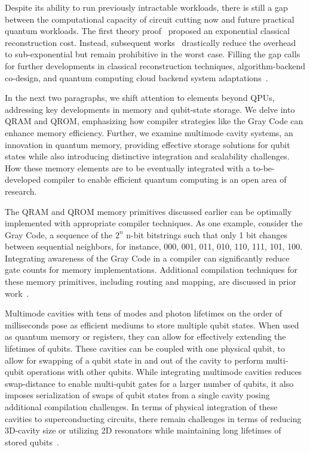 Despite its ability to run previously intractable workloads, there is still a gap between the computational capacity of circuit cutting now and future practical quantum workloads. The first theory proof~\cite{peng2020simulating} proposed an exponential classical reconstruction cost. Instead, subsequent works~\cite{tang2022scaleqc} drastically reduce the overhead to sub-exponential but remain prohibitive in the worst case. Filling the gap calls for further developments in classical reconstruction techniques, algorithm-backend co-design, and quantum computing cloud backend system adaptations~\cite{serverless}.

In the next two paragraphs, we shift attention to elements beyond QPUs, addressing key developments in memory and qubit-state storage. We delve into QRAM and QROM, emphasizing how compiler strategies like the Gray Code can enhance memory efficiency. Further, we examine multimode cavity systems, an innovation in quantum memory, providing effective storage solutions for qubit states while also introducing distinctive integration and scalability challenges. How these memory elements are to be eventually integrated with a to-be-developed compiler to enable efficient quantum computing is an open area of research.


The QRAM and QROM memory primitives discussed earlier can be optimally implemented with appropriate compiler techniques. As one example, consider the Gray Code, a sequence of the $2^n$ n-bit bitstrings such that only 1 bit changes between sequential neighbors, for instance, 000, 001, 011, 010, 110, 111, 101, 100. Integrating awareness of the Gray Code in a compiler can significantly reduce gate counts for memory implementations. Additional compilation techniques for these memory primitives, including routing and mapping, are discussed in prior work~\cite{di2021improving, xu2023systems,wang2023fundamental}.


Multimode cavities with tens of modes and photon lifetimes on the order of milliseconds pose as efficient mediums to store multiple qubit states. When used as quantum memory or registers, they can allow for effectively extending the lifetimes of qubits. These cavities can be coupled with one physical qubit, to allow for swapping of a qubit state in and out of the cavity to perform multi-qubit operations with other qubits. 
While integrating multimode cavities reduces swap-distance to enable multi-qubit gates for a larger number of qubits, it also imposes serialization of swaps of qubit states from a single cavity posing additional compilation challenges. In terms of physical integration of these cavities to superconducting circuits, there remain challenges in terms of reducing 3D-cavity size or utilizing 2D resonators while maintaining long lifetimes of stored qubits~\cite{chakram2021seamless}.


